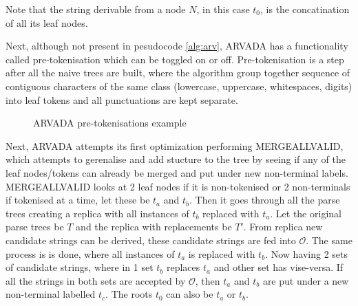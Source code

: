 Note that the string derivable from a node $N$, in this case $t_0$, is the concatination of all its leaf nodes. 

\vspace{\baselineskip}
Next, although not present in pesudocode \ref{alg:arv}, ARVADA has a functionality called pre-tokenisation which can be toggled on or off. Pre-tokenisation is a step after all the naive trees are built, where the algorithm group together sequence of contiguous characters of the same class (lowercase, uppercase, whitespaces, digits) into leaf tokens and all punctuations are kept separate.

\begin{figure}[h!]
\centering
{}

\caption{ARVADA pre-tokenisations example}
\label{fig:tokenisedNaiveTrees}
\end{figure}

Next, ARVADA attempts its first optimization performing MERGEALLVALID, which attempts to gerenalise and add stucture to the tree by seeing if any of the leaf nodes/tokens can already be merged and put under new non-terminal labels. MERGEALLVALID looks at 2 leaf nodes if it is non-tokenised or 2 non-terminals if tokenised at a time, let these be $t_a$ and $t_b$. Then it goes through all the parse trees creating a replica with all instances of $t_b$ replaced with $t_a$. Let the original parse trees be $T$ and the replica with replacements be $T'$. From replica new candidate strings can be derived, these candidate strings are fed into $\mathcal{O}$. The same process is is done, where all instances of $t_a$ is replaced with $t_b$. Now having 2 sets of candidate strings, where in 1 set $t_b$ replaces $t_a$ and other set has vise-versa. If all the strings in both sets are accepted by $\mathcal{O}$, then $t_a$ and $t_b$ are put under a new non-terminal labelled $t_c$. The roots $t_0$ can also be $t_a$ or $t_b$.


